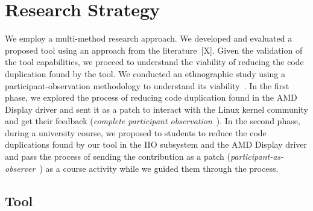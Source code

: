 \documentclass[10pt,conference]{IEEEtran}
\begin{document}
\section{Research Strategy}

We employ a multi-method research approach. We developed and evaluated a proposed tool using an approach from the literature~[X].
%
Given the validation of the tool capabilities, we proceed to understand the viability 
of reducing the code duplication found by the tool. We conducted an ethnographic study 
using a participant-observation methodology to understand its viability~\cite{}.
%
In the first phase, we explored the process of reducing code duplication found in the AMD Display driver and sent it as a patch to interact with the Linux kernel community and get their feedback (\textit{complete participant observation}~\cite{}).
%
In the second phase, during a university course, we proposed to students to reduce the code duplications found by our tool in the IIO subsystem and the AMD Display driver and pass the process of sending the contribution as a patch (\textit{participant-as-observer}~\cite{}) as a course activity while we guided them through the process.




\subsection{Tool}
\end{document}
